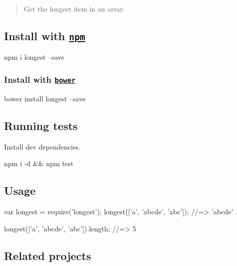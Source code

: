 \begin{quote}
Get the longest item in an array. \end{quote}


\subsection*{Install with \href{npmjs.org}{\tt npm}}


\begin{DoxyCode}
npm i longest --save
\end{DoxyCode}
 \subsubsection*{Install with \href{https://github.com/bower/bower}{\tt bower}}


\begin{DoxyCode}
bower install longest --save
\end{DoxyCode}


\subsection*{Running tests}

Install dev dependencies.


\begin{DoxyCode}
npm i -d && npm test
\end{DoxyCode}


\subsection*{Usage}


\begin{DoxyCode}
var longest = require('longest');
longest(['a', 'abcde', 'abc']);
//=> 'abcde'

longest(['a', 'abcde', 'abc']).length;
//=> 5
\end{DoxyCode}


\subsection*{Related projects}


